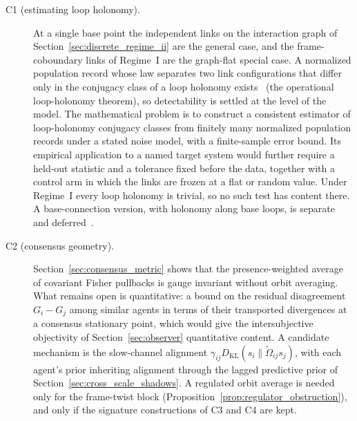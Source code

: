 \begin{description}
\item[C1 (estimating loop holonomy).] At a single base point the independent links on the interaction graph of Section~\ref{sec:discrete_regime_ii} are the general case, and the frame-coboundary links of Regime~I are the graph-flat special case. A normalized population record whose law separates two link configurations that differ only in the conjugacy class of a loop holonomy exists~\cite[Ch.~10]{DennisGaugeVFE2026} (the operational loop-holonomy theorem), so detectability is settled at the level of the model. The mathematical problem is to construct a consistent estimator of loop-holonomy conjugacy classes from finitely many normalized population records under a stated noise model, with a finite-sample error bound. Its empirical application to a named target system would further require a held-out statistic and a tolerance fixed before the data, together with a control arm in which the links are frozen at a flat or random value. Under Regime~I every loop holonomy is trivial, so no such test has content there. A base-connection version, with holonomy along base loops, is separate and deferred~\cite{DennisGaugeVFESuppB2026}.
\item[C2 (consensus geometry).] Section~\ref{sec:consensus_metric} shows that the presence-weighted average of covariant Fisher pullbacks is gauge invariant without orbit averaging. What remains open is quantitative: a bound on the residual disagreement $G_i - G_j$ among similar agents in terms of their transported divergences at a consensus stationary point, which would give the intersubjective objectivity of Section~\ref{sec:observer} quantitative content. A candidate mechanism is the slow-channel alignment $\gamma_{ij} D_{\mathrm{KL}}(s_i \| \tilde\Omega_{ij} s_j)$, with each agent's prior inheriting alignment through the lagged predictive prior of Section~\ref{sec:cross_scale_shadows}. A regulated orbit average is needed only for the frame-twist block (Proposition~\ref{prop:regulator_obstruction}), and only if the signature constructions of C3 and C4 are kept.

\end{description}
